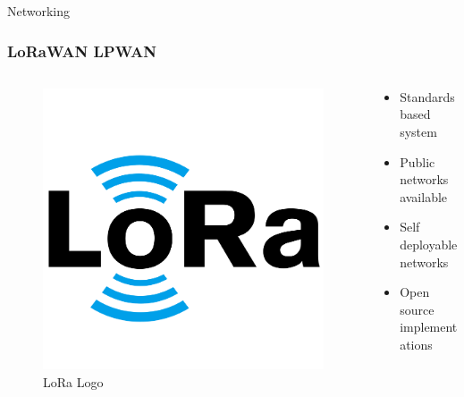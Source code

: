 \documentclass{beamer}
\begin{document}
  \begin{frame}{Networking}
    \frametitle{LoRaWAN LPWAN}
    \begin{columns}
      \begin{column}{0.5\textwidth}
        \begin{figure}[htbp]
          \centering
          \includegraphics[width=\textwidth]{images/lora_logo.png}
          \caption{LoRa Logo}
          \label{fig:LoRa_logo}
        \end{figure}
      \end{column}
      \begin{column}{0.5\textwidth}
        \begin{itemize}
          \item Standards based system
          \item Public networks available
          \item Self deployable networks
          \item Open source implementations
        \end{itemize}
      \end{column}
    \end{columns}
  \end{frame}
\end{document}
